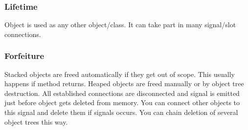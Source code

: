 \subsubsection*{Lifetime}
Object is used as any other \cpp{} object/class. It can take part in many signal/slot connections.

\subsubsection*{Forfeiture}
Stacked objects are freed automatically if they get out of scope. This usually happens if method returns. Heaped objects are freed manually or by object tree destruction. All established connections are disconnected and signal is emitted just before object gets deleted from memory. You can connect other objects to this signal and delete them if signals occurs. You can chain deletion of several object trees this way.